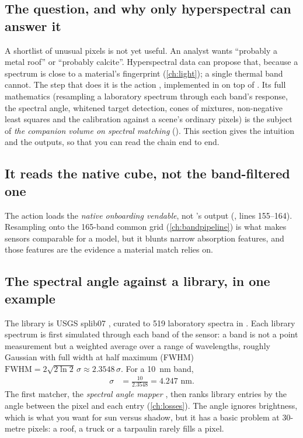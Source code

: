 \subsection{The question, and why only hyperspectral can answer it}

\begin{sloppypar}
A shortlist of unusual pixels is not yet useful. An analyst wants ``probably a metal roof'' or ``probably
calcite''. Hyperspectral data can propose that, because a spectrum is close to a material's fingerprint
(\cref{ch:light}); a single thermal band cannot. The step that does it is the action
, implemented in
 on top of .
Its full mathematics (resampling a laboratory spectrum through each band's response, the spectral angle,
whitened target detection, cones of mixtures, non-negative least squares and the calibration against a
scene's ordinary pixels) is the subject of \emph{the companion volume on spectral matching}
(). This section gives the intuition and the outputs, so that you can
read the chain end to end.
\end{sloppypar}

\subsection{It reads the native cube, not the band-filtered one}

The action loads the \emph{native onboarding vendable}, not 's output
(, lines 155--164). Resampling onto the 165-band common grid
(\cref{ch:bandpipeline}) is what makes sensors comparable for a model, but it blunts narrow absorption
features, and those features are the evidence a material match relies on.

\subsection{The spectral angle against a library, in one example}

The library is USGS splib07 \citep{kokaly2017usgs}, curated to 519 laboratory spectra in
 . Each library spectrum
is first simulated through each band of the sensor: a band is not a point measurement but a weighted
average over a range of wavelengths, roughly Gaussian with full width at half maximum (FWHM)
$\text{FWHM}=2\sqrt{2\ln2}\,\sigma\approx2.3548\,\sigma$. For a 10~nm band,
\begin{align*}
\sigma &= \frac{10}{2.3548} = 4.247\text{ nm}.
\end{align*}
The first matcher, the \emph{spectral angle mapper} \citep{kruse1993spectral},
then ranks library entries by the angle between the pixel and each entry (\cref{ch:losses}). The angle ignores
brightness, which is what you want for sun versus shadow, but it has a basic problem at 30-metre pixels: a
roof, a truck or a tarpaulin rarely fills a pixel.

